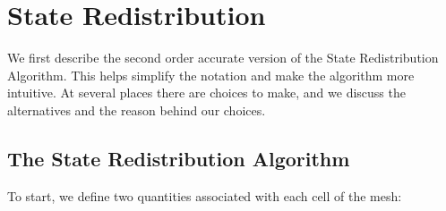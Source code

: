 \section{State Redistribution }\label{sec:srdAlg}

We first describe the second order accurate version of the State
Redistribution Algorithm. 
This helps simplify the notation and make the
algorithm more intuitive.   
At several places there are choices
to make, and we discuss the alternatives and the reason behind our
choices.  

\subsection{The State Redistribution Algorithm}

To start, we define two quantities associated with each cell of the mesh:

